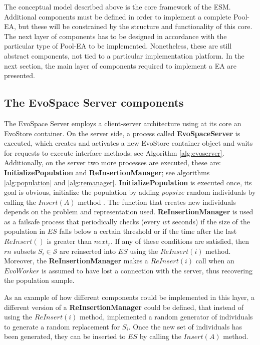 The conceptual model described above is the core framework of the ESM. Additional components must be defined in order to implement a complete Pool-EA, but these will be constrained by the structure and functionality of this core. The next layer of components has to be designed in accordance with the particular type of Pool-EA to be implemented. Nonetheless, these are still abstract components, not tied to a particular implementation platform. In the next section, the main layer of components required to implement a EA are presented. 

\subsection{The EvoSpace Server components}
The EvoSpace Server employs a client-server architecture using at its core an EvoStore container. On the server side, a process called \textbf{EvoSpaceServer} is executed, which creates and activates a new EvoStore container object and waits for requests to execute interface methods; see Algorithm \ref{alg:evoserver}. Additionally, on the server two more processes are executed, these are: \textbf{InitializePopulation} and \textbf{ReInsertionManager};
see algorithms \ref{alg:population} and \ref{alg:remanager}.
\textbf{InitializePopulation} is executed once, its goal is obvious, initialize the population by adding $popsize$ random
individuals by calling the $Insert(A)$ method . The function that creates new individuals depends on the problem and representation used.
\textbf{ReInsertionManager} is used as a failsafe process that periodically checks (every $wt$ seconds) if the size of the population in $ES$
falls below a certain threshold or if the time after the last $ReInsert()$ is greater than $next_r$.
If any of these conditions are satisfied, then $rn$ subsets $S_i \in \mathcal{S}$ are reinserted into $ES$ using the $ReInsert(i)$ method.
Moreover, the \textbf{ReInsertionManager} makes a $ReInsert(i)$ call when an $EvoWorker$ is assumed to have lost a connection with the server,
thus recovering the population sample.

As an example of how different components could be implemented in this layer, 
a different version of a \textbf{ReInsertionManager} could be defined, that instead of using the $ReInsert(i)$ method, implemented a random generator of
individuals to generate a random replacement for $S_i$. Once the new set of individuals has been generated, they can be inserted to $ES$ by calling the $Insert(A)$ method.

